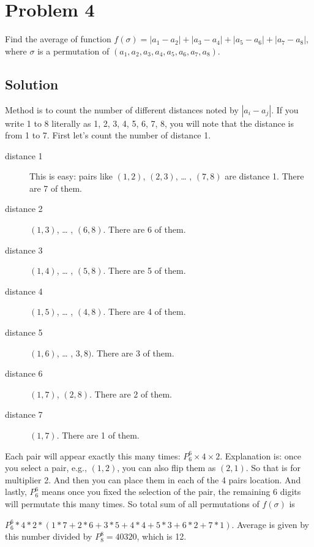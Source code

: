 \documentclass[11pt]{article}
\author{Sean Ni}
\date{\today}
\title{}
\begin{document}
\tableofcontents

\section{Problem 4}
\label{sec:org3965543}
Find the average of function \(f(\sigma) = |a_1 - a_2| + |a_3 - a_4| + |a_5 - a_6| + |a_7 - a_8|\), where \(\sigma\) is a permutation of \((a_1, a_2, a_3, a_4, a_5, a_6, a_7, a_8)\).



\subsection{Solution}
\label{sec:org6747ff0}
Method is to count the number of different distances noted by \(|a_i - a_j|\). If you write 1 to 8 literally as 1, 2, 3, 4, 5, 6, 7, 8, you will note that the distance is from 1 to 7. First let's count the number of distance 1.

\begin{description}
\item[{distance 1}] This is easy: pairs like \((1,2)\), \((2,3)\), \ldots{} , \((7,8)\) are distance 1. There are 7 of them.
\item[{distance 2}] \((1,3)\), \ldots{} , \((6,8)\). There are 6 of them.
\item[{distance 3}] \((1,4)\), \ldots{} , \((5,8)\). There are 5 of them.
\item[{distance 4}] \((1,5)\), \ldots{} , \((4,8)\). There are 4 of them.
\item[{distance 5}] \((1,6)\), \ldots{} , \(3,8)\). There are 3 of them.
\item[{distance 6}] \((1,7)\), \((2,8)\). There are 2 of them.
\item[{distance 7}] \((1,7)\). There are 1 of them.
\end{description}

Each pair will appear exactly this many times: \(P_6^6 \times 4 \times 2\). Explanation is: once you select a pair, e.g., \((1,2)\), you can also flip them as \((2,1)\). So that is for multiplier 2. And then you can place them in each of the 4 pairs location. And lastly, \(P_6^6\) means once you fixed the selection of the pair, the remaining 6 digits will permutate this many times. So total sum of all permutations of \(f(\sigma)\) is

\(P_6^6 * 4 * 2 * (1*7 + 2*6 + 3*5 + 4*4 + 5*3 + 6*2 + 7*1)\). Average is given by this number divided by \(P_8^8 = 40320\), which is 12.
\end{document}

